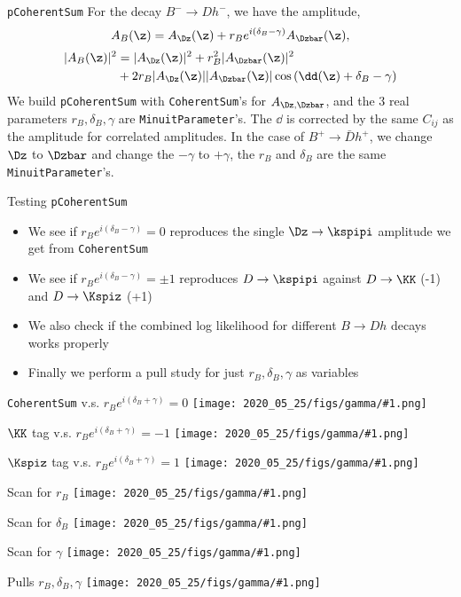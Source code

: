 \begin{frame}{\texttt{pCoherentSum}}
        For the decay $B^- \to D h^-$, we have the amplitude,
	\begin{equation}
                        A_B(\z) = A_{\Dz}(\z) + r_B e^{i \left(\delta_B - \gamma\right)} A_{\Dzbar}(\z), 
	\end{equation}
        \begin{equation}
                \begin{split}
			|A_B(\z)|^2 &= |A_{\Dz}(\z)|^2 + r_B^2 |A_{\Dzbar}(\z)|^2 \\ &+ 2 r_B |A_{\Dz}(\z)||A_{\Dzbar}(\z)| \cos \left(\dd(\z) + \delta_B - \gamma\right)
                \end{split}
        \end{equation}
        We build \texttt{pCoherentSum} with \texttt{CoherentSum}'s for $A_{\Dz, \Dzbar}$, and the 3 real parameters $r_B, \delta_B, \gamma$ are \texttt{MinuitParameter}'s. 
        The $\dd$ is corrected by the same $C_{ij}$ as the amplitude for correlated amplitudes.
        In the case of $B^+ \to \bar{D} h^+$, we change $\Dz$ to $\Dzbar$ and change the $-\gamma$ to $+\gamma$, the $r_B$ and $\delta_B$ are the same \texttt{MinuitParameter}'s.
        
   \end{frame}
   
\begin{frame}{Testing \texttt{pCoherentSum}}
	\begin{itemize}
		\item We see if $r_B e^{i (\delta_B - \gamma)} =0$ reproduces the single $\Dz \to \kspipi$ amplitude we get from \texttt{CoherentSum}
		\item We see if $r_B e^{i (\delta_B - \gamma)} =\pm1$ reproduces $D \to \kspipi$ against $D \to \KK$ (-1) and $D \to \Kspiz$ (+1)
		\item We also check if the combined log likelihood for different $B \to D h$ decays works properly
		\item Finally we perform a pull study for just $r_B, \delta_B, \gamma$ as variables
	\end{itemize}
\end{frame}

\newcommand{\comparetf}[2]{
	\begin{frame}{#2}
		\texttt{[image: 2020\_05\_25/figs/gamma/\#1.png]}
	\end{frame}
}


\comparetf{uncorrVStest0}{\texttt{CoherentSum} v.s. $r_B e^{i(\delta_B + \gamma)} = 0$}
\comparetf{KKVStestKK}{$\KK$ tag v.s. $r_B e^{i(\delta_B + \gamma)} = -1$}
\comparetf{Kspi0VStestKspi0}{$\Kspiz$ tag v.s. $r_B e^{i(\delta_B + \gamma)} = 1$}
\comparetf{rB_Norm}{Scan for $r_B$}
\comparetf{dB_Norm}{Scan for $\delta_B$}
\comparetf{gamma_Norm}{Scan for $\gamma$}
\comparetf{pullTest}{Pulls $ r_B, \delta_B, \gamma$}

